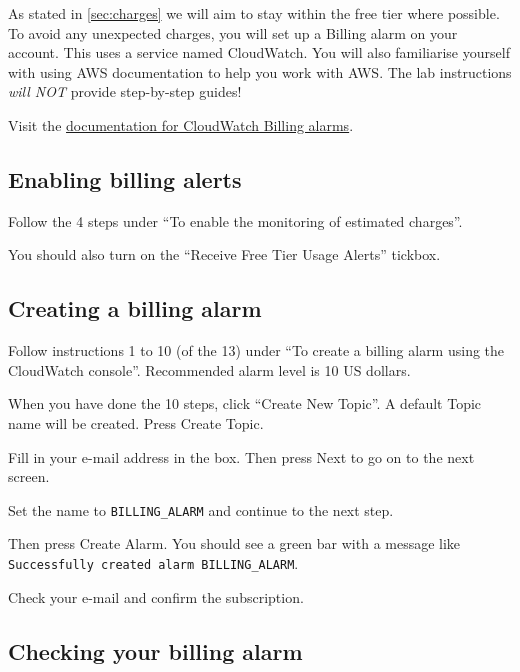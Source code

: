 As stated in \autoref{sec:charges} we will aim to stay within the free tier where possible.
To avoid any unexpected charges, you will set up a Billing alarm on your account.
This uses a service named CloudWatch.
You will also familiarise yourself with using AWS documentation to help you work with AWS.
The lab instructions \textit{will NOT} provide step-by-step guides!

Visit the \href{https://docs.aws.amazon.com/AmazonCloudWatch/latest/monitoring/monitor_estimated_charges_with_cloudwatch.html}{documentation for CloudWatch Billing alarms}.

\subsection{Enabling billing alerts}

Follow the 4 steps under ``To enable the monitoring of estimated charges''.

You should also turn on the ``Receive Free Tier Usage Alerts'' tickbox.

\subsection{Creating a billing alarm}

Follow instructions 1 to 10 (of the 13) under ``To create a billing alarm using the CloudWatch console''.
Recommended alarm level is 10 US dollars.

When you have done the 10 steps, click ``Create New Topic''.
A default Topic name will be created.
Press Create Topic.

Fill in your e-mail address in the box.
Then press Next to go on to the next screen.

Set the name to \texttt{BILLING\_ALARM} and continue to the next step. 

Then press Create Alarm.
You should see a green bar with a message like \texttt{Successfully created alarm BILLING\_ALARM}.

Check your e-mail and confirm the subscription.

\subsection{Checking your billing alarm}

